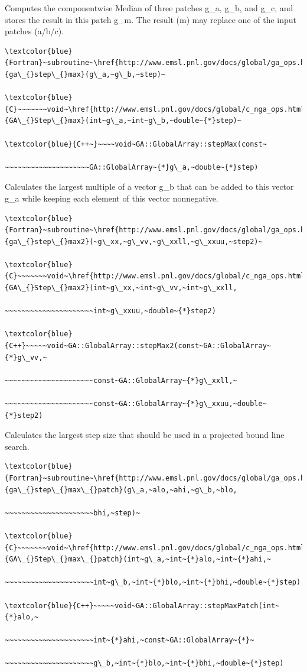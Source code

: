 Computes the componentwise Median of three patches g\_a, g\_b, and
g\_c, and stores the result in this patch g\_m. The result (m) may
replace one of the input patches (a/b/c). 
\begin{verbatim}
\textcolor{blue}{Fortran}~subroutine~\href{http://www.emsl.pnl.gov/docs/global/ga_ops.html\#ga_step_max}{ga\_{}step\_{}max}(g\_a,~g\_b,~step)~

\textcolor{blue}{C}~~~~~~~void~\href{http://www.emsl.pnl.gov/docs/global/c_nga_ops.html\#ga_step_max}{GA\_{}Step\_{}max}(int~g\_a,~int~g\_b,~double~{*}step)~

\textcolor{blue}{C++~}~~~~void~GA::GlobalArray::stepMax(const~

~~~~~~~~~~~~~~~~~~~~GA::GlobalArray~{*}g\_a,~double~{*}step)
\end{verbatim}
Calculates the largest multiple of a vector g\_b that can be added
to this vector g\_a while keeping each element of this vector nonnegative. 
\begin{verbatim}
\textcolor{blue}{Fortran}~subroutine~\href{http://www.emsl.pnl.gov/docs/global/ga_ops.html\#ga_step_max2}{ga\_{}step\_{}max2}(~g\_xx,~g\_vv,~g\_xxll,~g\_xxuu,~step2)~

\textcolor{blue}{C}~~~~~~~void~\href{http://www.emsl.pnl.gov/docs/global/c_nga_ops.html\#ga_step_max2}{GA\_{}Step\_{}max2}(int~g\_xx,~int~g\_vv,~int~g\_xxll,

~~~~~~~~~~~~~~~~~~~~~int~g\_xxuu,~double~{*}step2)

\textcolor{blue}{C++}~~~~~void~GA::GlobalArray::stepMax2(const~GA::GlobalArray~{*}g\_vv,~

~~~~~~~~~~~~~~~~~~~~~const~GA::GlobalArray~{*}g\_xxll,~

~~~~~~~~~~~~~~~~~~~~~const~GA::GlobalArray~{*}g\_xxuu,~double~{*}step2)
\end{verbatim}
Calculates the largest step size that should be used in a projected
bound line search. 
\begin{verbatim}
\textcolor{blue}{Fortran}~subroutine~\href{http://www.emsl.pnl.gov/docs/global/ga_ops.html\#ga_step_max_patch}{ga\_{}step\_{}max\_{}patch}(g\_a,~alo,~ahi,~g\_b,~blo,

~~~~~~~~~~~~~~~~~~~~~bhi,~step)~

\textcolor{blue}{C}~~~~~~~void~\href{http://www.emsl.pnl.gov/docs/global/c_nga_ops.html\#ga_step_max_patch}{GA\_{}Step\_{}max\_{}patch}(int~g\_a,~int~{*}alo,~int~{*}ahi,~

~~~~~~~~~~~~~~~~~~~~~int~g\_b,~int~{*}blo,~int~{*}bhi,~double~{*}step)

\textcolor{blue}{C++}~~~~~void~GA::GlobalArray::stepMaxPatch(int~{*}alo,~

~~~~~~~~~~~~~~~~~~~~~int~{*}ahi,~const~GA::GlobalArray~{*}~

~~~~~~~~~~~~~~~~~~~~~g\_b,~int~{*}blo,~int~{*}bhi,~double~{*}step)
\end{verbatim}

